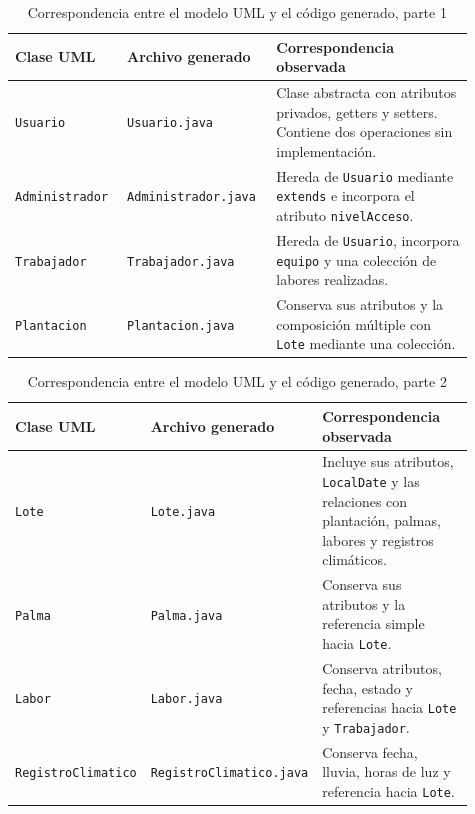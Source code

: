\begin{table}[htbp]
\centering
\small
\caption{Correspondencia entre el modelo UML y el código generado, parte 1}
\begin{tabular}{|p{0.22\linewidth}|p{0.28\linewidth}|p{0.41\linewidth}|}
\hline
\textbf{Clase UML} & \textbf{Archivo generado} & \textbf{Correspondencia observada} \\
\hline
\texttt{Usuario} & \texttt{Usuario.java} & Clase abstracta con atributos privados, getters y setters. Contiene dos operaciones sin implementación. \\
\hline
\texttt{Administrador} & \texttt{Administrador.java} & Hereda de \texttt{Usuario} mediante \texttt{extends} e incorpora el atributo \texttt{nivelAcceso}. \\
\hline
\texttt{Trabajador} & \texttt{Trabajador.java} & Hereda de \texttt{Usuario}, incorpora \texttt{equipo} y una colección de labores realizadas. \\
\hline
\texttt{Plantacion} & \texttt{Plantacion.java} & Conserva sus atributos y la composición múltiple con \texttt{Lote} mediante una colección. \\
\hline
\end{tabular}
\end{table}

\begin{table}[htbp]
\centering
\small
\caption{Correspondencia entre el modelo UML y el código generado, parte 2}
\begin{tabular}{|p{0.22\linewidth}|p{0.28\linewidth}|p{0.41\linewidth}|}
\hline
\textbf{Clase UML} & \textbf{Archivo generado} & \textbf{Correspondencia observada} \\
\hline
\texttt{Lote} & \texttt{Lote.java} & Incluye sus atributos, \texttt{LocalDate} y las relaciones con plantación, palmas, labores y registros climáticos. \\
\hline
\texttt{Palma} & \texttt{Palma.java} & Conserva sus atributos y la referencia simple hacia \texttt{Lote}. \\
\hline
\texttt{Labor} & \texttt{Labor.java} & Conserva atributos, fecha, estado y referencias hacia \texttt{Lote} y \texttt{Trabajador}. \\
\hline
\texttt{RegistroClimatico} & \texttt{RegistroClimatico.java} & Conserva fecha, lluvia, horas de luz y referencia hacia \texttt{Lote}. \\
\hline
\end{tabular}
\end{table}

